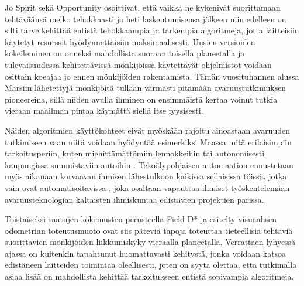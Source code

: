 \documentclass[finnish]{tktltiki2}
\theoremstyle{definition}
\theoremstyle{remark}
\begin{document}
Jo Spirit sekä Opportunity osoittivat, että vaikka ne kykenivät suorittamaan tehtäväänsä melko tehokkaasti jo heti laskeutumisensa jälkeen niin edelleen on silti tarve kehittää entistä tehokkaampia ja tarkempia algoritmeja, jotta laitteisiin käytetyt resurssit hyödynnettäisiin maksimaalisesti. Uusien versioiden kokeileminen on onneksi mahdollista suoraan toisella planeetalla ja tulevaisuudessa kehitettävissä mönkijöissä käytettävät ohjelmistot voidaan osittain koeajaa jo ennen mönkijöiden rakentamista. Tämän vuosituhannen alussa Marsiin lähetettyjä mönkijöitä tullaan varmasti pitämään avaruustutkimuksen pioneereina, sillä niiden avulla ihminen on ensimmäistä kertaa voinut tutkia vieraan maailman pintaa käymättä siellä itse fyysisesti.

Näiden algoritmien käyttökohteet eivät myöskään rajoitu ainoastaan avaruuden tutkimiseen vaan niitä voidaan hyödyntää esimerkiksi Maassa mitä erilaisimpiin tarkoitusperiin, kuten miehittämättömiin lennokkeihin \cite{huang2011visual} tai autonomisesti kaupungissa suunnistaviin autoihin \cite{scaramuzza2009real}. Tekoälypohjaisen automaation ennustetaan myös aikanaan korvaavan ihmisen lähestulkoon kaikissa sellaisissa töissä, jotka vain ovat automatisoitavissa \cite{rifkin1996end}, joka osaltaan vapauttaa ihmiset työskentelemään avaruusteknologian kaltaisten ihmiskuntaa edistävien projektien parissa.

Toistaiseksi saatujen kokemusten perusteella Field D* ja esitelty visuaalisen odometrian toteutusmuoto ovat siis päteviä tapoja toteuttaa tieteellisiä tehtäviä suorittavien mönkijöiden liikkumiskyky vieraalla planeetalla. Verrattaen lyhyessä ajassa on kuitenkin tapahtunut huomattavasti kehitystä, jonka voidaan katsoa edistäneen laitteiden toimintaa oleellisesti, joten on syytä olettaa, että tutkimalla asiaa lisää on mahdollista kehittää tarkoitukseen entistä sopivampia algoritmeja.







% 
\end{document}
